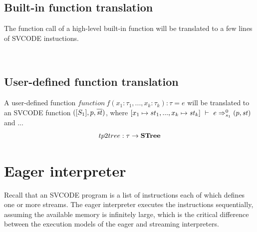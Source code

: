 

\subsection{Built-in function translation}
The function call of a high-level built-in function will be translated to a few lines of SVCODE instuctions.

	\\[5ex]




\subsection{User-defined function translation}
A user-defined function $function \  f(x_1: \tau_1, ..., x_k: \tau_k): \tau = e $ will be translated to an SVCODE function
$([S_1], p, \overline{\mathit{st}})$, where $\Trans{[x_1 \|-> st_1,..., x_k \|-> \st_k ]}{e}{0}{s_1}{\sfun{p}{\st}}$ and ...
$$ tp2tree : \tau \rightarrow \mathbf{STree}  $$ 


\section{Eager interpreter}
Recall that an SVCODE program is a list of instructions each of which defines one or more streams. 
The eager interpreter executes the instructions sequentially, assuming the available memory is infinitely large, which is the critical difference between the execution models of the eager and streaming interpreters.

